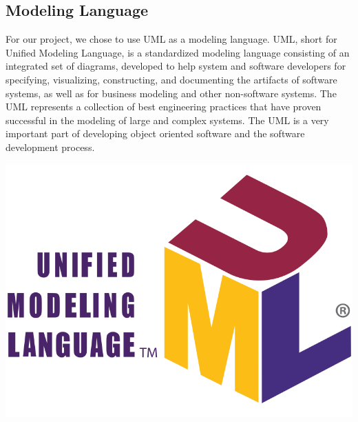 \documentclass{report}
\begin{document}
\subsection {Modeling Language}
 \textnormal{
For our project, we chose to use UML as a modeling language.\newline
UML, short for Unified Modeling Language, is a standardized modeling language consisting of an integrated set of diagrams, developed to help system and software developers for specifying, visualizing, constructing, and documenting the artifacts of software systems, as well as for business modeling and other non-software systems. The UML represents a collection of best engineering practices that have proven successful in the modeling of large and complex systems. The UML is a very important part of developing object oriented software and the software development process. 
}
\begin{center}
 \includegraphics[scale=0.15]{images/uml.png}
\end{center}
\end{document}
